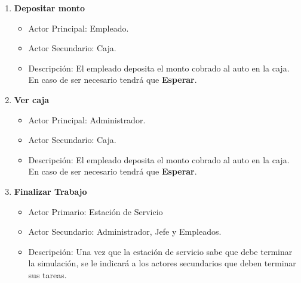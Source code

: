\documentclass[a4paper,12pt]{article}
\begin{document}
\begin{enumerate}
	
	\item \textbf{Depositar monto}
	\begin{itemize}
		\item Actor Principal: Empleado.
		\item Actor Secundario: Caja.
		\item Descripción: El empleado deposita el monto cobrado al auto en la caja. En caso de ser
		 necesario tendrá que \textbf{Esperar}.
	\end{itemize}	
	
	\item \textbf{Ver caja}
	\begin{itemize}
		\item Actor Principal: Administrador.
		\item Actor Secundario: Caja.
		\item Descripción: El empleado deposita el monto cobrado al auto en la caja. En caso de ser
		 necesario tendrá que \textbf{Esperar}.
	\end{itemize}	

	\item \textbf{Finalizar Trabajo}
	\begin{itemize}
		\item Actor Primario: Estación de Servicio
		\item Actor Secundario: Administrador, Jefe y Empleados.
		\item Descripción: Una vez que la estación de servicio sabe que debe terminar la simulación,
		se le indicará a los actores secundarios que deben terminar sus tareas.
	\end{itemize}	

	
\end{enumerate}
\end{document}

